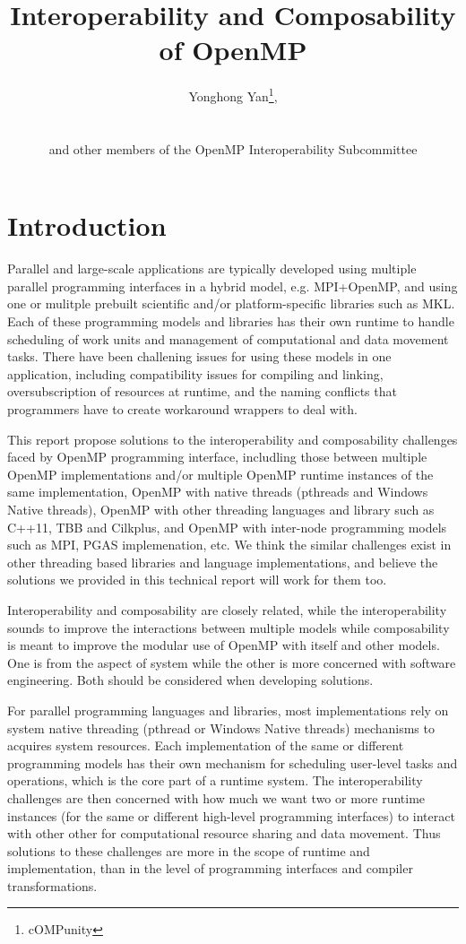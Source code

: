 \documentclass{article}
\title{Interoperability and Composability of OpenMP\textsuperscript{\textregistered}}
\author{Yonghong Yan\thanks{cOMPunity}, 
\\~\\
\\
and other members of the OpenMP Interoperability Subcommittee}
\begin{document}
                                                
\maketitle
\section{Introduction}
Parallel and large-scale applications are typically developed using multiple parallel programming interfaces in 
a hybrid model, e.g. MPI+OpenMP, and using one or mulitple prebuilt scientific and/or platform-specific libraries such as MKL.
Each of these programming models and libraries has their own runtime to handle scheduling of work units and management of computational
and data movement tasks. There have been challening issues for using these models in one application, including 
compatibility issues for compiling and linking, oversubscription of resources at runtime, and the naming conflicts that 
programmers have to create workaround wrappers to deal with.

This report propose solutions to the interoperability and composability challenges faced by OpenMP programming interface, includling those
between multiple OpenMP implementations and/or multiple OpenMP runtime instances of the same implementation, OpenMP 
with native threads (pthreads and Windows Native threads), OpenMP with other threading languages and library such 
as C++11, TBB and Cilkplus, and OpenMP with inter-node programming models such as MPI, PGAS implemenation, etc. We 
think the similar challenges exist in other threading based libraries and language implementations, and believe
the solutions we provided in this technical report will work for them too.  

Interoperability and composability are closely related, while the interoperability sounds to improve the interactions between multiple models
while composability is meant to improve the modular use of OpenMP with itself and other models. One is from the aspect of system while 
the other is more concerned with software engineering. Both should be considered when developing solutions. 

For parallel programming languages and libraries, most implementations rely on system native threading (pthread or Windows Native threads) 
mechanisms to acquires system resources. Each implementation of the same or different programming models has their own mechanism for scheduling
user-level tasks and operations, which is the core part of a runtime system. 
The interoperability challenges are then concerned with how much we want two or more 
runtime instances (for the same or different high-level programming interfaces) to interact with other other for computational resource sharing
and data movement. Thus solutions to these challenges are more in the scope of runtime and implementation, than in the level of programming
interfaces and compiler transformations. 
\end{document}

